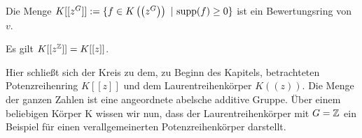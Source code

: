 %
%
%
%
%
%
%
\begin{satz}
Die Menge $K\lbrack\lbrack z^G\rbrack\rbrack := \lbrace f \in K\left(\left(z^G\right)\right)~ \vert~ \textup{supp}(f) \geq 0\rbrace$ ist ein Bewertungsring von $v$.
\end{satz}
%
%
%
%
%
%
%
%
\begin{bsp}
Es gilt $K\lbrack\lbrack z^{\mathbb{Z}}\rbrack\rbrack = K\lbrack\lbrack z\rbrack\rbrack$.
\end{bsp}
%
%
Hier schließt sich der Kreis zu dem, zu Beginn des Kapitels, betrachteten Potenzreihenring $K[[z]]$ und dem Laurentreihenkörper $K((z))$. Die Menge der ganzen Zahlen ist eine angeordnete abelsche additive Gruppe. Über einem beliebigen Körper K wissen wir nun, dass der Laurentreihenkörper mit $G = \mathbb{Z}$ ein Beispiel für einen verallgemeinerten Potenzreihenkörper darstellt.
%
%
%
%
%
%
%
